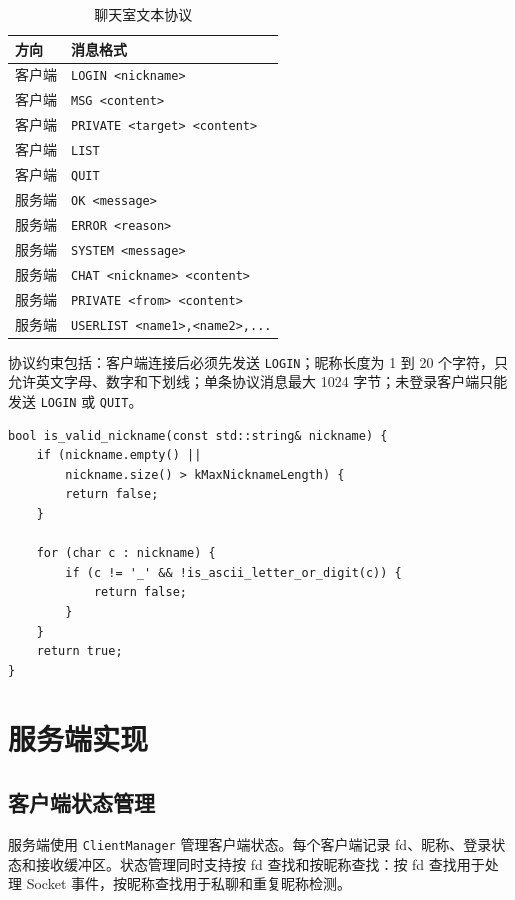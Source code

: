 \documentclass[UTF8,zihao=5,twocolumn]{ctexart}
\newcommand{\code}[1]{\texttt{#1}}
\begin{document}
\begin{table}[ht]
\centering
\caption{聊天室文本协议}
\label{tab:protocol}
\small
\begin{tabular}{ll}
\toprule
方向 & 消息格式 \\
\midrule
客户端 & \code{LOGIN <nickname>} \\
客户端 & \code{MSG <content>} \\
客户端 & \code{PRIVATE <target> <content>} \\
客户端 & \code{LIST} \\
客户端 & \code{QUIT} \\
\midrule
服务端 & \code{OK <message>} \\
服务端 & \code{ERROR <reason>} \\
服务端 & \code{SYSTEM <message>} \\
服务端 & \code{CHAT <nickname> <content>} \\
服务端 & \code{PRIVATE <from> <content>} \\
服务端 & \code{USERLIST <name1>,<name2>,...} \\
\bottomrule
\end{tabular}
\end{table}

协议约束包括：客户端连接后必须先发送 \code{LOGIN}；昵称长度为 1 到 20 个字符，只允许英文字母、数字和下划线；单条协议消息最大 1024 字节；未登录客户端只能发送 \code{LOGIN} 或 \code{QUIT}。

\begin{lstlisting}[style=cppstyle,caption={昵称合法性检查},label={lst:nickname}]
bool is_valid_nickname(const std::string& nickname) {
    if (nickname.empty() ||
        nickname.size() > kMaxNicknameLength) {
        return false;
    }

    for (char c : nickname) {
        if (c != '_' && !is_ascii_letter_or_digit(c)) {
            return false;
        }
    }
    return true;
}
\end{lstlisting}

\section{服务端实现}

\subsection{客户端状态管理}

服务端使用 \code{ClientManager} 管理客户端状态。每个客户端记录 fd、昵称、登录状态和接收缓冲区。状态管理同时支持按 fd 查找和按昵称查找：按 fd 查找用于处理 Socket 事件，按昵称查找用于私聊和重复昵称检测。
\end{document}
